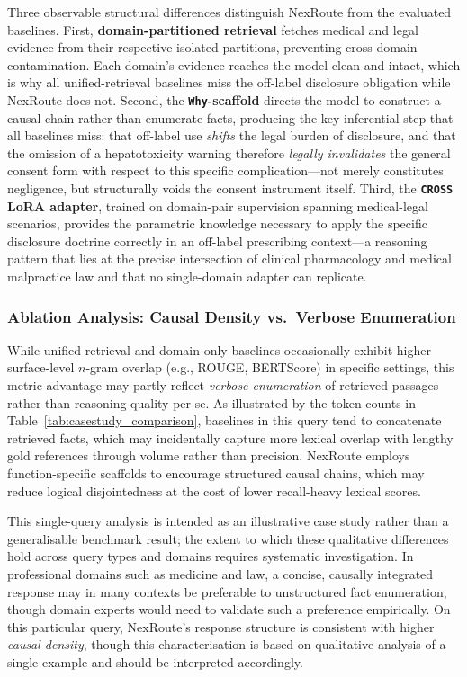 \documentclass[a4paper,fleql]{cas-sc}
\begin{document}
Three observable structural differences distinguish NexRoute from the evaluated baselines. First, \textbf{domain-partitioned retrieval} fetches medical and legal
evidence from their respective isolated partitions, preventing cross-domain
contamination. Each domain's evidence reaches the model clean and intact,
which is why all unified-retrieval baselines miss the off-label disclosure
obligation while NexRoute does not. Second, the \textbf{\texttt{Why}-scaffold} directs the
model to construct a causal chain rather than enumerate facts, producing the
key inferential step that all baselines miss: that off-label use \emph{shifts}
the legal burden of disclosure, and that the omission of a hepatotoxicity
warning therefore \emph{legally invalidates} the general consent form with
respect to this specific complication---not merely constitutes negligence, but
structurally voids the consent instrument itself. Third, the
\textbf{\texttt{CROSS} LoRA adapter}, trained on domain-pair supervision
spanning medical-legal scenarios, provides the parametric knowledge necessary
to apply the specific disclosure doctrine correctly in an off-label prescribing
context---a reasoning pattern that lies at the precise intersection of clinical
pharmacology and medical malpractice law and that no single-domain adapter can
replicate.

\subsubsection{Ablation Analysis: Causal Density vs.\ Verbose Enumeration}
\label{sssec:causal-density}
While unified-retrieval and domain-only baselines occasionally exhibit higher
surface-level $n$-gram overlap (e.g., ROUGE, BERTScore) in specific settings,
this metric advantage may partly reflect \textit{verbose enumeration} of
retrieved passages rather than reasoning quality per se. As illustrated by the
token counts in Table~\ref{tab:casestudy_comparison}, baselines in this query
tend to concatenate retrieved facts, which may incidentally capture more
lexical overlap with lengthy gold references through volume rather than
precision. NexRoute employs function-specific scaffolds to encourage structured
causal chains, which may reduce logical disjointedness at the cost of lower
recall-heavy lexical scores.

This single-query analysis is intended as an illustrative case study rather
than a generalisable benchmark result; the extent to which these qualitative
differences hold across query types and domains requires systematic
investigation. In professional domains such as medicine and law, a concise,
causally integrated response may in many contexts be preferable to unstructured
fact enumeration, though domain experts would need to validate such a
preference empirically. On this particular query, NexRoute's response structure
is consistent with higher \textit{causal density}, though this characterisation
is based on qualitative analysis of a single example and should be interpreted
accordingly.
\end{document}
